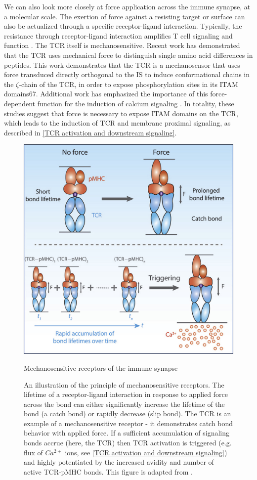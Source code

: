 We can also look more closely at force application across the immune synapse, at a molecular scale. The exertion of force against a resisting target or surface can also be actualized through a specific receptor-ligand interaction. Typically, the resistance through receptor-ligand interaction amplifies T cell signaling and function \cite{Huse}. The TCR itself is mechanosensitive. Recent work has demonstrated that the TCR uses mechanical force to distinguish single amino acid differences in peptides. This work demonstrates that the TCR is a mechanosensor that uses force transduced directly orthogonal to the IS to induce conformational chains in the $\zeta$-chain of the TCR, in order to expose phosphorylation sites in its ITAM domains67. Additional work has emphasized the importance of this force-dependent function for the induction of calcium signaling \cite{Liu2014}. In totality, these studies suggest that force is necessary to expose ITAM domains on the TCR, which leads to the induction of TCR and membrane proximal signaling, as described in \ref{TCR activation and downstream signaling}. 


\begin{figure}[htbp]
	\centering
	\includegraphics[width=0.8\columnwidth]{../figures/chapter1/tcrcatchbond.jpg}
	\caption{Mechanosensitive receptors of the immune synapse}
	\caption*{An illustration of the principle of mechanosensitive receptors. The lifetime of a receptor-ligand interaction in response to applied force across the bond can either significantly increase the lifetime of the bond (a catch bond) or rapidly decrease (slip bond). The TCR is an example of a mechanosensitive receptor -  it demonstrates catch bond behavior with applied force. If a sufficient accumulation of signaling bonds accrue (here, the TCR) then TCR activation is triggered (e.g. flux of $Ca^{2+}$ ions, see \ref{TCR activation and downstream signaling}) and highly potentiated by the increased avidity and number of active TCR-pMHC bonds. This figure is adapted from \cite{Liu2014}.}
	\label{fig:tcrcatchbond}
\end{figure}

